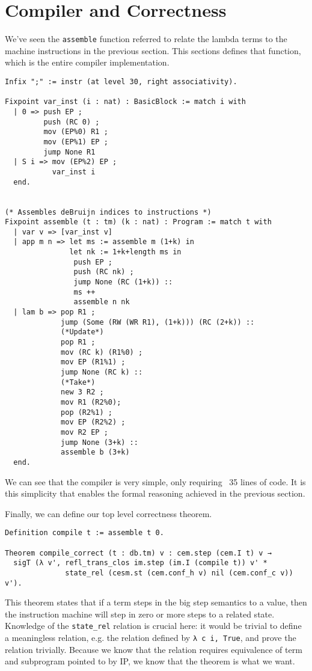 \section{Compiler and Correctness}

We've seen the \texttt{assemble} function referred to relate the lambda terms to
the machine instructions in the previous section. This sections defines that
function, which is the entire compiler implementation.

\begin{verbatim}
Infix ";" := instr (at level 30, right associativity).

Fixpoint var_inst (i : nat) : BasicBlock := match i with
  | 0 => push EP ;
         push (RC 0) ;
         mov (EP%0) R1 ;
         mov (EP%1) EP ;
         jump None R1
  | S i => mov (EP%2) EP ; 
           var_inst i
  end.


(* Assembles deBruijn indices to instructions *)
Fixpoint assemble (t : tm) (k : nat) : Program := match t with  
  | var v => [var_inst v]
  | app m n => let ms := assemble m (1+k) in
               let nk := 1+k+length ms in
                push EP ;
                push (RC nk) ;
                jump None (RC (1+k)) :: 
                ms ++ 
                assemble n nk
  | lam b => pop R1 ;
             jump (Some (RW (WR R1), (1+k))) (RC (2+k)) ::
             (*Update*)
             pop R1 ;  
             mov (RC k) (R1%0) ;
             mov EP (R1%1) ;
             jump None (RC k) ::
             (*Take*)
             new 3 R2 ;
             mov R1 (R2%0);
             pop (R2%1) ;
             mov EP (R2%2) ;
             mov R2 EP ;
             jump None (3+k) :: 
             assemble b (3+k)
  end. 
\end{verbatim}
We can see that the compiler is very simple, only requiring ~35 lines of code.
It is this simplicity that enables the formal reasoning achieved in the previous
section. 

Finally, we can define our top level correctness theorem.

\begin{verbatim}
Definition compile t := assemble t 0.

Theorem compile_correct (t : db.tm) v : cem.step (cem.I t) v → 
  sigT (λ v', refl_trans_clos im.step (im.I (compile t)) v' *
              state_rel (cesm.st (cem.conf_h v) nil (cem.conf_c v)) v').
\end{verbatim}
This theorem states that if a term steps in the big step semantics to a value,
then the instruction machine will step in zero or more steps to a related state.
Knowledge of the \texttt{state\_rel} relation is crucial here: it would be
trivial to define a meaningless relation, e.g. the relation defined by
\texttt{λ c i, True}, and prove the relation trivially. Because we know that
the relation requires equivalence of term and subprogram pointed to by IP, we
know that the theorem is what we want.
